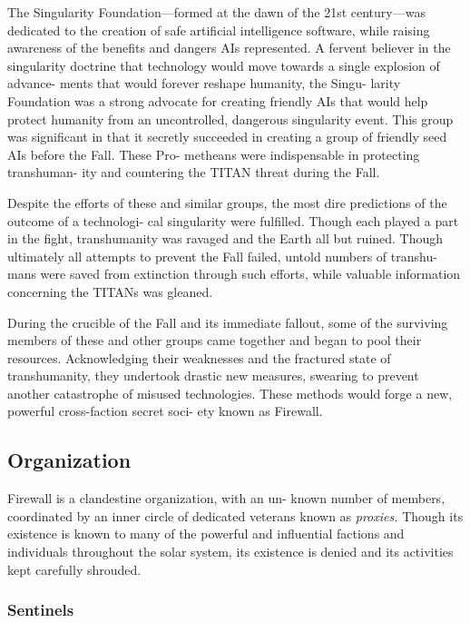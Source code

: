 The Singularity Foundation—formed at the dawn of 
the 21st century—was dedicated to the creation of safe 
artificial intelligence software, while raising awareness 
of the benefits and dangers AIs represented. A fervent 
believer in the singularity doctrine that technology 
would move towards a single explosion of advance-
ments that would forever reshape humanity, the Singu-
larity Foundation was a strong advocate for creating 
friendly AIs that would help protect humanity from an 
uncontrolled, dangerous singularity event. This group 
was significant in that it secretly succeeded in creating 
a group of friendly seed AIs before the Fall. These Pro-
metheans were indispensable in protecting transhuman-
ity and countering the TITAN threat during the Fall.

Despite the efforts of these and similar groups, the 
most dire predictions of the outcome of a technologi-
cal singularity were fulfilled. Though each played a 
part in the fight, transhumanity was ravaged and the 
Earth all but ruined. Though ultimately all attempts 
to prevent the Fall failed, untold numbers of transhu-
mans were saved from extinction through such efforts, 
while valuable information concerning the TITANs 
was gleaned.

During the crucible of the Fall and its immediate 
fallout, some of the surviving members of these and 
other groups came together and began to pool their 
resources. Acknowledging their weaknesses and the 
fractured state of transhumanity, they undertook 
drastic new measures, swearing to prevent another 
catastrophe of misused technologies. These methods 
would forge a new, powerful cross-faction secret soci-
ety known as Firewall. 

\subsection{Organization }

Firewall is a clandestine organization, with an un-
known number of members, coordinated by an inner 
circle of dedicated veterans known as \textit{proxies.} Though 
its existence is known to many of the powerful and 
influential factions and individuals throughout the 
solar system, its existence is denied and its activities 
kept carefully shrouded. 

\subsubsection{Sentinels}

